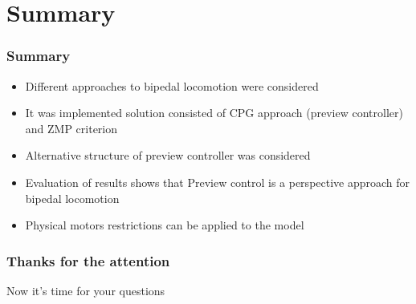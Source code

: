 \documentclass{beamer}
\begin{document}
	\section*{Summary}
	\begin{frame}
		\frametitle{Summary}
		\begin{itemize}
			\item
				Different approaches to bipedal locomotion were considered
			\item
				It was implemented solution consisted of CPG approach (preview controller) and ZMP criterion
			\item
				Alternative structure of preview controller was considered
			\item
				Evaluation of results shows that Preview control is a perspective approach for bipedal locomotion
			\item
				Physical motors restrictions can be applied to the model
		\end{itemize}
	\end{frame}


	\begin{frame}
		\frametitle{Thanks for the attention}
		Now it's time for your questions
		\begin{figure}[h]
		\end{figure}
	\end{frame}
	
	
\end{document}
